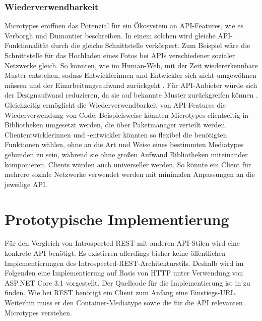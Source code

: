 \subsubsection{Wiederverwendbarkeit}
Microtypes eröffnen das Potenzial für ein Ökosystem an API-Features, wie es Verborgh und Dumontier beschreiben. In einem solchen wird gleiche API-Funktionalität durch die gleiche Schnittstelle verkörpert. Zum Beispiel wäre die Schnittstelle für das Hochladen eines Fotos bei APIs verschiedener sozialer Netzwerke gleich. So könnten, wie im Human-Web, mit der Zeit wiedererkennbare Muster entstehen, sodass Entwicklerinnen und Entwickler sich nicht umgewöhnen müssen und der Einarbeitungsaufwand zurückgeht \autocite{Verborgh2018}. Für API-Anbieter würde sich der Designaufwand reduzieren, da sie auf bekannte Muster zurückgreifen können \autocite{Wilde2018}. Gleichzeitig ermöglicht die Wiederverwendbarkeit von API-Features die Wiederverwendung von Code. Beispielsweise könnten Microtypes clientseitig in Bibliotheken umgesetzt werden, die über Paketmanager verteilt werden. Cliententwicklerinnen und -entwickler könnten so flexibel die benötigten Funktionen wählen, ohne an die Art und Weise eines bestimmten Mediatypes gebunden zu sein, während sie ohne großen Aufwand Bibliotheken miteinander komponieren. Clients würden auch universeller werden. So könnte ein Client für mehrere soziale Netzwerke verwendet werden mit minimalen Anpassungen an die jeweilige API.

\section{Prototypische Implementierung}\label{sec:intrest|prototype}

Für den Vergleich von Introspected REST mit anderen API-Stilen wird eine konkrete API benötigt. Es existieren allerdings bisher keine öffentlichen Implementierungen des Introspected-REST-Architekturstils. Deshalb wird im Folgenden eine Implementierung auf Basis von HTTP unter Verwendung von ASP.NET Core 3.1\footnotemark{} vorgestellt. Der Quellcode für die Implementierung ist in  zu finden. Wie bei REST benötigt ein Client zum Anfang eine Einstiegs-URL\@. Weiterhin muss er den Container-Mediatype sowie die für die API relevanten Microtypes verstehen.


